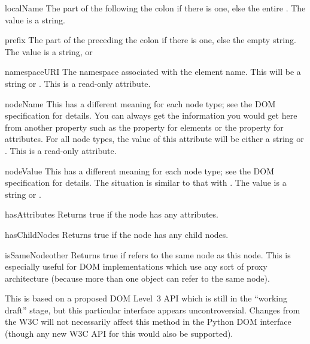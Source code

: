 \begin{memberdesc}[Node]{localName}
The part of the  following the colon if there is one,
else the entire .  The value is a string.
\end{memberdesc}

\begin{memberdesc}[Node]{prefix}
The part of the  preceding the colon if there is one,
else the empty string.  The value is a string, or 
\end{memberdesc}

\begin{memberdesc}[Node]{namespaceURI}
The namespace associated with the element name.  This will be a
string or .  This is a read-only attribute.
\end{memberdesc}

\begin{memberdesc}[Node]{nodeName}
This has a different meaning for each node type; see the DOM
specification for details.  You can always get the information you
would get here from another property such as the 
property for elements or the  property for attributes.
For all node types, the value of this attribute will be either a
string or .  This is a read-only attribute.
\end{memberdesc}

\begin{memberdesc}[Node]{nodeValue}
This has a different meaning for each node type; see the DOM
specification for details.  The situation is similar to that with
.  The value is a string or .
\end{memberdesc}

\begin{methoddesc}[Node]{hasAttributes}{}
Returns true if the node has any attributes.
\end{methoddesc}

\begin{methoddesc}[Node]{hasChildNodes}{}
Returns true if the node has any child nodes.
\end{methoddesc}

\begin{methoddesc}[Node]{isSameNode}{other}
Returns true if  refers to the same node as this node.
This is especially useful for DOM implementations which use any sort
of proxy architecture (because more than one object can refer to the
same node).

\begin{notice}
  This is based on a proposed DOM Level~3 API which is still in the
  ``working draft'' stage, but this particular interface appears
  uncontroversial.  Changes from the W3C will not necessarily affect
  this method in the Python DOM interface (though any new W3C API for
  this would also be supported).
\end{notice}
\end{methoddesc}

